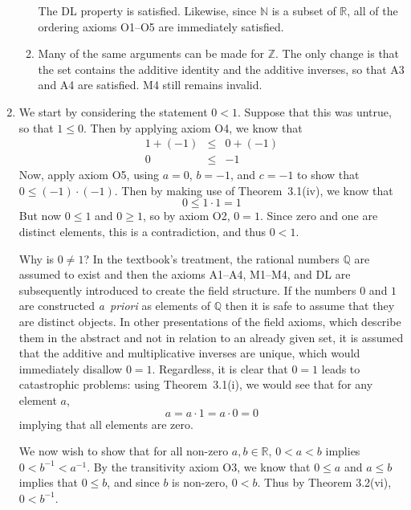 \documentclass[12pt]{article}
\newcommand{\N}{\mathbb{N}}
\newcommand{\Z}{\mathbb{Z}}
\newcommand{\Q}{\mathbb{Q}}
\newcommand{\R}{\mathbb{R}}
\begin{document}
\begin{enumerate}
\begin{enumerate}
	The DL property is satisfied. Likewise, since $\N$ is a subset of $\R$,
	all of the ordering axioms O1--O5 are immediately satisfied.
      \item Many of the same arguments can be made for $\Z$. The only change is
	that the set contains the additive identity and the additive inverses,
	so that A3 and A4 are satisfied. M4 still remains invalid.
    \end{enumerate}
  \item We start by considering the statement $0<1$. Suppose that this was untrue,
    so that $1 \le 0$. Then by applying axiom O4, we know that
    \begin{eqnarray*}
      1 + (-1) &\le& 0 + (-1) \\
      0 &\le& -1
    \end{eqnarray*}
    Now, apply axiom O5, using $a=0$, $b=-1$, and $c=-1$ to show that $0 \le
    (-1)\cdot(-1)$. Then by making use of Theorem~3.1(iv), we know that
    \[
      0 \le 1 \cdot 1 = 1
    \]
    But now $0 \le 1$ and $0 \ge 1$, so by axiom O2, $0=1$. Since zero and one
    are distinct elements, this is a contradiction, and thus $0<1$.
   
    Why is $0 \ne 1$? In the textbook's treatment, the rational numbers $\Q$
    are assumed to exist and then the axioms A1--A4, M1--M4, and DL are
    subsequently introduced to create the field structure. If the numbers $0$
    and $1$ are constructed {\it a~priori} as elements of $\Q$ then it is safe
    to assume that they are distinct objects. In other presentations of the
    field axioms, which describe them in the abstract and not in relation to an
    already given set, it is assumed that the additive and multiplicative
    inverses are unique, which would immediately disallow $0=1$. Regardless, it
    is clear that $0=1$ leads to catastrophic problems: using Theorem~3.1(i),
    we would see that for any element $a$,
    \[
      a = a\cdot 1 = a\cdot 0 = 0
    \]
    implying that all elements are zero.

    We now wish to show that for all non-zero $a,b\in \R$, $0<a<b$ implies
    $0<b^{-1} < a^{-1}$. By the transitivity axiom O3, we know that $0\le a$
    and $a \le b$ implies that $0\le b$, and since $b$ is non-zero, $0<b$. Thus
    by Theorem 3.2(vi), $0<b^{-1}$.
    

\end{enumerate}
\end{document}
